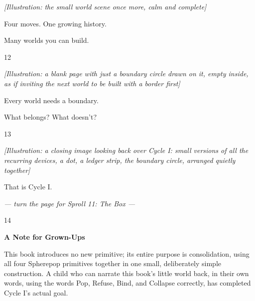 \documentclass[12pt]{book}
\newcommand{\artnote}[1]{{\color{gray!70}\small\itshape [Illustration: #1]}\par\vspace{0.3in}}
\newcommand{\bigline}[1]{{\Huge #1}\par}
\newcommand{\pagenum}[1]{\vfill{\color{gray!50}\footnotesize #1}}
\newcommand{\sprollpage}{\newpage\vspace*{0.4in}}
\begin{document}
\sprollpage
\begin{center}
\vspace*{0.8in}
\artnote{the small world scene once more, calm and complete}
\vspace{0.35in}
\bigline{Four moves. One growing history.}\vspace{0.1in}
{\Large Many worlds you can build.}
\end{center}
\pagenum{12}

\sprollpage
\begin{center}
\vspace*{0.6in}
\artnote{a blank page with just a boundary circle drawn on it, empty inside, as if inviting the next world to be built with a border first}
\vspace{0.3in}
\bigline{Every world needs a boundary.}\vspace{0.1in}
{\Large What belongs? What doesn't?}
\end{center}
\pagenum{13}

\sprollpage
\begin{center}
\vspace*{0.7in}
\artnote{a closing image looking back over Cycle I: small versions of all the recurring devices, a dot, a ledger strip, the boundary circle, arranged quietly together}
\vspace{0.3in}
\bigline{That is Cycle I.}
\vspace{0.3in}
{\small \textit{--- turn the page for Sproll 11: The Box ---}}
\end{center}
\pagenum{14}

\sprollpage
\vspace*{0.3in}
{\large \textbf{A Note for Grown-Ups}}
\vspace{0.2in}

\normalsize
This book introduces no new primitive; its entire purpose is consolidation, using all four Spherepop primitives together in one small, deliberately simple construction. A child who can narrate this book's little world back, in their own words, using the words Pop, Refuse, Bind, and Collapse correctly, has completed Cycle I's actual goal.
\end{document}
